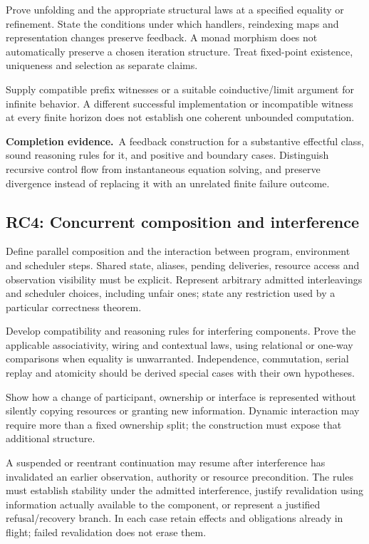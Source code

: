 \documentclass[11pt,a4paper]{article}
\newcommand{\deliver}{\par\textbf{Completion evidence.}\ }
\begin{document}
Prove unfolding and the appropriate structural laws at a specified equality or refinement. State the conditions under which handlers, reindexing maps and representation changes preserve feedback. A monad morphism does not automatically preserve a chosen iteration structure. Treat fixed-point existence, uniqueness and selection as separate claims.

Supply compatible prefix witnesses or a suitable coinductive/limit argument for infinite behavior. A different successful implementation or incompatible witness at every finite horizon does not establish one coherent unbounded computation.

\deliver A feedback construction for a substantive effectful class, sound reasoning rules for it, and positive and boundary cases. Distinguish recursive control flow from instantaneous equation solving, and preserve divergence instead of replacing it with an unrelated finite failure outcome.

\subsection*{RC4: Concurrent composition and interference}\label{rc4}
Define parallel composition and the interaction between program, environment and scheduler steps. Shared state, aliases, pending deliveries, resource access and observation visibility must be explicit. Represent arbitrary admitted interleavings and scheduler choices, including unfair ones; state any restriction used by a particular correctness theorem.

Develop compatibility and reasoning rules for interfering components. Prove the applicable associativity, wiring and contextual laws, using relational or one-way comparisons when equality is unwarranted. Independence, commutation, serial replay and atomicity should be derived special cases with their own hypotheses.

Show how a change of participant, ownership or interface is represented without silently copying resources or granting new information. Dynamic interaction may require more than a fixed ownership split; the construction must expose that additional structure.

A suspended or reentrant continuation may resume after interference has invalidated an earlier observation, authority or resource precondition. The rules must establish stability under the admitted interference, justify revalidation using information actually available to the component, or represent a justified refusal/recovery branch. In each case retain effects and obligations already in flight; failed revalidation does not erase them.
\end{document}
